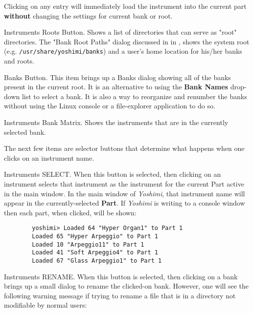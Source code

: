    Clicking on any entry will immediately load the instrument into the
   current part \textbf{without} changing the settings for current bank or
   root.

   Instruments Roots Button.
   Shows a list of directories that can serve as "root" directories.
   The "Bank Root Paths" dialog discussed in
    in
   , shows
   the system root (e.g. \texttt{/usr/share/yoshimi/banks}) and
   a user's home location for his/her banks and roots.

   Banks Button.
   This item brings up a Banks dialog showing all of the banks present in the
   current root.
   It is an alternative to using the \textbf{Bank Names} drop-down list to
   select a bank.  It is also a way to reorganize and renumber the
   banks without using the Linux console or a file-explorer application to do
   so.

   Instruments Bank Matrix.
   Shows the instruments that are in the currently selected bank.

   The next few items are selector buttons that determine what happens when one
   clicks on an instrument name.

   Instruments SELECT.
   When this button is selected, then clicking on an instrument selects that
   instrument as the instrument for the current Part active in the main
   window.  In the main window of \textsl{Yoshimi}, that instrument name will
   appear in the currently-selected \textbf{Part}.  If \textsl{Yoshimi} is
   writing to a console window then each part, when clicked, will be shown:

   \begin{verbatim}
		yoshimi> Loaded 64 "Hyper Organ1" to Part 1
		Loaded 65 "Hyper Arpeggio" to Part 1
		Loaded 10 "Arpeggio11" to Part 1
		Loaded 41 "Soft Arpeggio4" to Part 1
		Loaded 67 "Glass Arpeggio1" to Part 1
   \end{verbatim}

   Instruments RENAME.
   When this button is selected, then clicking on a bank brings
   up a small dialog to rename the clicked-on bank.
   However, one will see the following warning message if trying to rename a
   file that is in a directory not modifiable by normal users:

